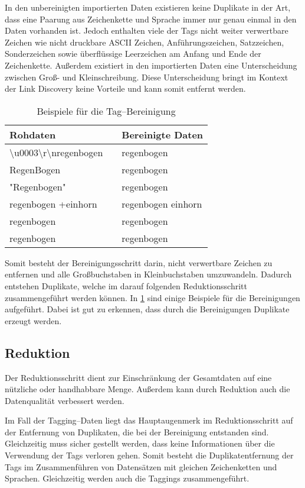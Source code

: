 In den unbereinigten importierten Daten existieren keine Duplikate in der Art, dass eine Paarung aus Zeichenkette und Sprache immer nur genau einmal in den Daten vorhanden ist. Jedoch enthalten viele der Tags nicht weiter verwertbare Zeichen wie nicht druckbare ASCII Zeichen, Anführungszeichen, Satzzeichen, Sonderzeichen sowie überflüssige Leerzeichen am Anfang und Ende der Zeichenkette. Außerdem existiert in den importierten Daten eine Unterscheidung zwischen Groß- und Kleinschreibung. Diese Unterscheidung bringt im Kontext der Link Discovery keine Vorteile und kann somit entfernt werden.

\begin{table}[h]
\centering
\begin{tabular}{lcl}
    \toprule
    Rohdaten & \phantom{abc} & Bereinigte Daten \\
    \midrule
    \textbackslash u0003\textbackslash r\textbackslash nregenbogen && regenbogen \\
    RegenBogen && regenbogen \\
    "Regenbogen" && regenbogen \\
    regenbogen +einhorn && regenbogen einhorn\\
    \phantom{abc} regenbogen && regenbogen \\
    regenbogen && regenbogen \\
    \bottomrule
\end{tabular}
\caption{Beispiele für die Tag--Bereinigung}
\label{tab:tag_cleaning}
\end{table}

Somit besteht der Bereinigungsschritt darin, nicht verwertbare Zeichen zu entfernen und alle Großbuchstaben in Kleinbuchstaben umzuwandeln. Dadurch entstehen Duplikate, welche im darauf folgenden Reduktionsschritt zusammengeführt werden können. In \cref{tab:tag_cleaning} sind einige Beispiele für die Bereinigungen aufgeführt. Dabei ist gut zu erkennen, dass durch die Bereinigungen Duplikate erzeugt werden.

\subsection{Reduktion}
\label{tag_reduction}

Der Reduktionsschritt dient zur Einschränkung der Gesamtdaten auf eine nützliche oder handhabbare Menge. Außerdem kann durch Reduktion auch die Datenqualität verbessert werden.

Im Fall der Tagging--Daten liegt das Hauptaugenmerk im Reduktionsschritt auf der Entfernung von Duplikaten, die bei der Bereinigung entstanden sind. Gleichzeitig muss sicher gestellt werden, dass keine Informationen über die Verwendung der Tags verloren gehen. Somit besteht die Duplikatentfernung der Tags im Zusammenführen von Datensätzen mit gleichen Zeichenketten und Sprachen. Gleichzeitig werden auch die Taggings zusammengeführt.

